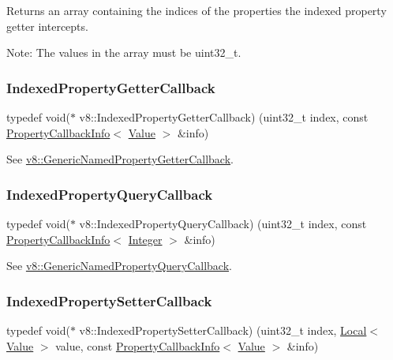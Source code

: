 Returns an array containing the indices of the properties the indexed property getter intercepts.

Note\+: The values in the array must be uint32\+\_\+t. \mbox{\label{namespacev8_a48e7816ba64447bf32a25d194588daaf}} 
\subsubsection{\texorpdfstring{Indexed\+Property\+Getter\+Callback}{IndexedPropertyGetterCallback}}
{\footnotesize\ttfamily typedef void($\ast$ v8\+::\+Indexed\+Property\+Getter\+Callback) (uint32\+\_\+t index, const \mbox{\hyperlink{classv8_1_1PropertyCallbackInfo}{Property\+Callback\+Info}}$<$ \mbox{\hyperlink{classv8_1_1Value}{Value}} $>$ \&info)}

See {\ttfamily \mbox{\hyperlink{namespacev8_a24b1801fa53a7c5a71366d8044927563}{v8\+::\+Generic\+Named\+Property\+Getter\+Callback}}}. \mbox{\label{namespacev8_a980b62c33eb664783e61e25c3b27f9ee}} 
\subsubsection{\texorpdfstring{Indexed\+Property\+Query\+Callback}{IndexedPropertyQueryCallback}}
{\footnotesize\ttfamily typedef void($\ast$ v8\+::\+Indexed\+Property\+Query\+Callback) (uint32\+\_\+t index, const \mbox{\hyperlink{classv8_1_1PropertyCallbackInfo}{Property\+Callback\+Info}}$<$ \mbox{\hyperlink{classv8_1_1Integer}{Integer}} $>$ \&info)}

See {\ttfamily \mbox{\hyperlink{namespacev8_add9f7ab11e4a9a2b9ad2c4536b0e1a64}{v8\+::\+Generic\+Named\+Property\+Query\+Callback}}}. \mbox{\label{namespacev8_a4ac7cc6185ebc8b6a199f9fa8e6bf5c3}} 
\subsubsection{\texorpdfstring{Indexed\+Property\+Setter\+Callback}{IndexedPropertySetterCallback}}
{\footnotesize\ttfamily typedef void($\ast$ v8\+::\+Indexed\+Property\+Setter\+Callback) (uint32\+\_\+t index, \mbox{\hyperlink{classv8_1_1Local}{Local}}$<$ \mbox{\hyperlink{classv8_1_1Value}{Value}} $>$ value, const \mbox{\hyperlink{classv8_1_1PropertyCallbackInfo}{Property\+Callback\+Info}}$<$ \mbox{\hyperlink{classv8_1_1Value}{Value}} $>$ \&info)}


